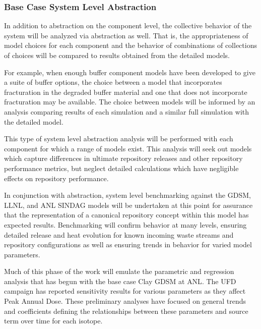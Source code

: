 \subsubsection{Base Case System Level Abstraction}


In addition to abstraction on the component level, the collective behavior of 
the system will be analyzed via abstraction as well. That is, the
appropriateness of model choices for each component and the behavior of 
combinations of collections of choices will be compared to results obtained from 
the detailed models. 


For example, when enough buffer component models have been developed to give a 
suite of buffer options, the choice between a model that incorporates
fracturation in the degraded buffer material and one that does not incorporate 
fracturation may be available.  The choice between models will be informed by an 
analysis comparing results of each simulation and a similar full simulation with  
the detailed model.


This type of system level abstraction analysis will be performed with each 
component for which a range of models exist. This analysis will seek out models 
which capture differences in ultimate repository releases and other repository 
performance metrics, but neglect detailed calculations which have negligible effects
on repository performance.


In conjunction with abstraction, system level benchmarking against the \gls{GDSM}, 
\gls{LLNL}, and \gls{ANL} \gls{SINDAG} models will be undertaken at this point for 
assurance that the representation of a canonical repository concept within this  
model has expected results. Benchmarking will confirm behavior at many levels, 
ensuring detailed release and heat evolution for known incoming waste streams
and repository configurations as well as ensuring trends in behavior for 
varied model parameters.


Much of this phase of the work will emulate the parametric and regression analysis that
has begun with the base case Clay \gls{GDSM} at \gls{ANL}.  
The \gls{UFD} campaign has reported sensitivity results for various 
parameters as they affect Peak Annual Dose. These preliminary analyses have focused on 
general trends and coefficients defining the relationships between these 
parameters and source term over time for each isotope. 

